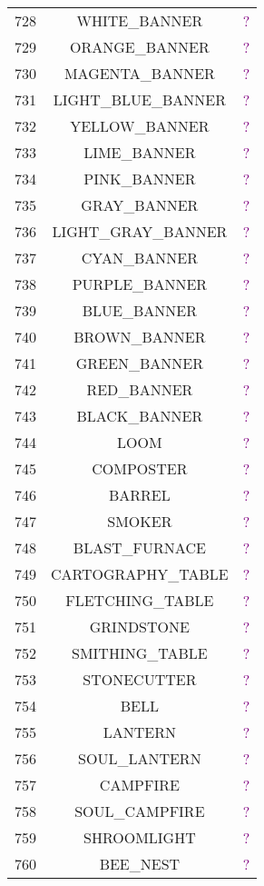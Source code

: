 \documentclass[11pt]{article}
\newcommand\myworries[1]{\textcolor{purple}{#1}}
\begin{document}
\begin{longtable}{ |c|c|c| }
	728 & WHITE\_BANNER & \myworries{?} \\
	729 & ORANGE\_BANNER & \myworries{?} \\
	730 & MAGENTA\_BANNER & \myworries{?} \\
	731 & LIGHT\_BLUE\_BANNER & \myworries{?} \\
	732 & YELLOW\_BANNER & \myworries{?} \\
	733 & LIME\_BANNER & \myworries{?} \\
	734 & PINK\_BANNER & \myworries{?} \\
	735 & GRAY\_BANNER & \myworries{?} \\
	736 & LIGHT\_GRAY\_BANNER & \myworries{?} \\
	737 & CYAN\_BANNER & \myworries{?} \\
	738 & PURPLE\_BANNER & \myworries{?} \\
	739 & BLUE\_BANNER & \myworries{?} \\
	740 & BROWN\_BANNER & \myworries{?} \\
	741 & GREEN\_BANNER & \myworries{?} \\
	742 & RED\_BANNER & \myworries{?} \\
	743 & BLACK\_BANNER & \myworries{?} \\
	744 & LOOM & \myworries{?} \\
	745 & COMPOSTER & \myworries{?} \\
	746 & BARREL & \myworries{?} \\
	747 & SMOKER & \myworries{?} \\
	748 & BLAST\_FURNACE & \myworries{?} \\
	749 & CARTOGRAPHY\_TABLE & \myworries{?} \\
	750 & FLETCHING\_TABLE & \myworries{?} \\
	751 & GRINDSTONE & \myworries{?} \\
	752 & SMITHING\_TABLE & \myworries{?} \\
	753 & STONECUTTER & \myworries{?} \\
	754 & BELL & \myworries{?} \\
	755 & LANTERN & \myworries{?} \\
	756 & SOUL\_LANTERN & \myworries{?} \\
	757 & CAMPFIRE & \myworries{?} \\
	758 & SOUL\_CAMPFIRE & \myworries{?} \\
	759 & SHROOMLIGHT & \myworries{?} \\
	760 & BEE\_NEST & \myworries{?} \\

\end{longtable}
\end{document}
